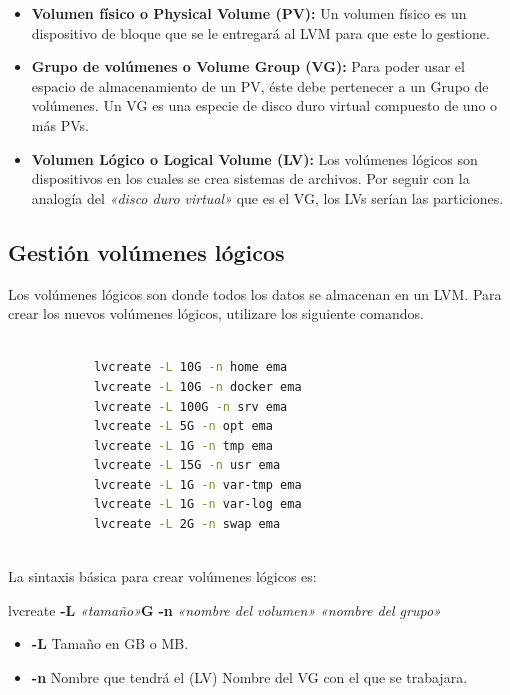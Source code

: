 				\begin{itemize}
					
					\item \textbf{Volumen físico o Physical Volume (PV):} Un volumen físico es un dispositivo de bloque que se le entregará al LVM para que este lo gestione.
					
					\item \textbf{Grupo de volúmenes o Volume Group (VG):} Para poder usar el espacio de almacenamiento de un PV, éste debe pertenecer a un Grupo de volúmenes. Un VG es una especie de disco duro virtual compuesto de uno o más PVs. 
					
					\item \textbf{Volumen Lógico o Logical Volume (LV):} Los volúmenes lógicos son dispositivos en los cuales se crea sistemas de archivos. Por seguir con la analogía del \textit{«disco duro virtual»} que es el VG, los LVs serían las particiones. 
					
				\end{itemize}
			
	
		\subsection{Gestión volúmenes lógicos}
		
			Los volúmenes lógicos son donde todos los datos se almacenan en un LVM. Para crear los nuevos volúmenes lógicos, utilizare los siguiente comandos.

			
			\begin{lstlisting}[language=Bash, caption=Creación de (LV)]
				
			lvcreate -L 10G -n home ema
			lvcreate -L 10G -n docker ema
			lvcreate -L 100G -n srv ema
			lvcreate -L 5G -n opt ema
			lvcreate -L 1G -n tmp ema
			lvcreate -L 15G -n usr ema
			lvcreate -L 1G -n var-tmp ema
			lvcreate -L 1G -n var-log ema
			lvcreate -L 2G -n swap ema
								
			\end{lstlisting}
		
			La sintaxis básica para crear volúmenes lógicos es:
			
			lvcreate \textbf{-L} \textit{«tamaño»}\textbf{G} \textbf{-n} \textit{«nombre del volumen»} \textit{«nombre del grupo»}
			
			\begin{itemize}
				
				\item \textbf{-L} Tamaño en GB o MB.
				\item \textbf{-n} Nombre que tendrá el (LV) Nombre del VG con el que se trabajara.
			 
			\end{itemize}
			
